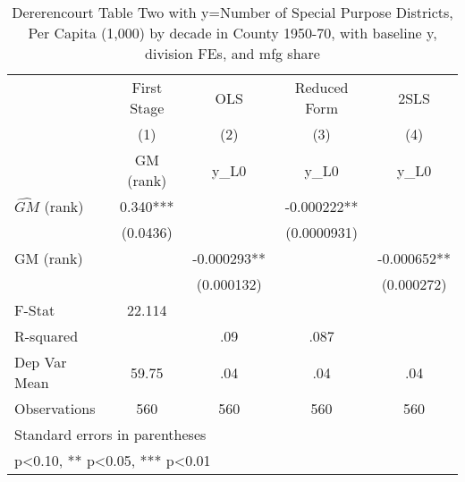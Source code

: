 \begin{table}[htbp]\centering
\def\sym#1{\ifmmode^{#1}\else\(^{#1}\)\fi}
\caption{Dererencourt Table Two with y=Number of Special Purpose Districts, Per Capita (1,000) by decade in County 1950-70, with baseline y, division FEs, and mfg share}
\begin{tabular}{l*{4}{c}}
\toprule
                    & First Stage   &         OLS   &Reduced Form   &        2SLS   \\
                    &\multicolumn{1}{c}{(1)}&\multicolumn{1}{c}{(2)}&\multicolumn{1}{c}{(3)}&\multicolumn{1}{c}{(4)}\\
                    &\multicolumn{1}{c}{GM  (rank)}&\multicolumn{1}{c}{y\_L0}&\multicolumn{1}{c}{y\_L0}&\multicolumn{1}{c}{y\_L0}\\
\midrule
$\hat{GM}$ (rank)   &       0.340***&               &   -0.000222** &               \\
                    &    (0.0436)   &               & (0.0000931)   &               \\
\addlinespace
GM  (rank)          &               &   -0.000293** &               &   -0.000652** \\
                    &               &  (0.000132)   &               &  (0.000272)   \\
\midrule
F-Stat              &      22.114   &               &               &               \\
R-squared           &               &         .09   &        .087   &               \\
Dep Var Mean        &       59.75   &         .04   &         .04   &         .04   \\
Observations        &         560   &         560   &         560   &         560   \\
\bottomrule
\multicolumn{5}{l}{\footnotesize Standard errors in parentheses}\\
\multicolumn{5}{l}{\footnotesize * p<0.10, ** p<0.05, *** p<0.01}\\
\end{tabular}
\end{table}

